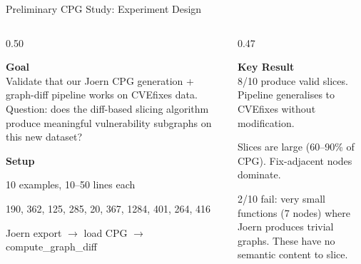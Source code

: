 \documentclass[aspectratio=169,10pt]{beamer}
\begin{document}
\begin{frame}{Preliminary CPG Study: Experiment Design}
\begin{columns}[T]
\begin{column}{0.50\textwidth}

  \textbf{Goal}\\[3pt]
  {\small Validate that our Joern CPG generation + graph-diff pipeline
  works on CVEfixes data. Question: does the diff-based slicing algorithm
  produce meaningful vulnerability subgraphs on this new dataset?}

  \vspace{0.6em}
  \textbf{Setup}
  \begin{description}
    \item[\textbf{N}] 10 examples, 10–50 lines each
    \item[\textbf{CWEs}] 190, 362, 125, 285, 20, 367, 1284, 401, 264, 416
    \item[\textbf{Pipeline}] Joern export $\to$ load CPG $\to$ compute\_graph\_diff
  \end{description}

\end{column}
\begin{column}{0.47\textwidth}

  \textbf{Key Result}\\[4pt]
  {\small\textcolor{hit}{} 8/10 produce valid slices.
  Pipeline generalises to CVEfixes without modification.}

  \vspace{0.5em}
  {\small\textcolor{warn}{} Slices are large
  (60--90\% of CPG). Fix-adjacent nodes dominate.}

  \vspace{0.5em}
  {\small\textcolor{miss}{} 2/10 fail: very small functions
  (7 nodes) where Joern produces trivial graphs. These have no semantic content
  to slice.}
\end{column}
\end{columns}
\end{frame}
\end{document}
